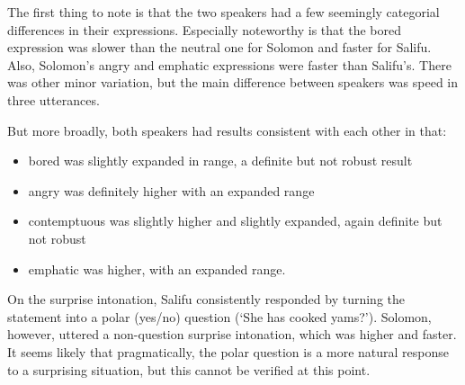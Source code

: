 \documentclass[output=paper]{langsci/langscibook}
\begin{document}
\begin{table}

\caption{`S/he has cooked yams' \emph{ù dìgìwó nyʊ́à} (Salifu)}
\label{tab:4.cahill}

\end{table}



The first thing to note is that the two speakers had a few seemingly categorial differences in their expressions. Especially noteworthy is that the bored expression was slower than the neutral one for Solomon and faster for Salifu. Also, Solomon's angry and emphatic expressions were faster than Salifu's. There was other minor variation, but the main difference between speakers was speed in three utterances.

But more broadly, both speakers had results consistent with each other in that:

\begin{itemize}
\item bored was slightly expanded in range, a definite but not robust result
\item angry was definitely higher with an expanded range
\item contemptuous was slightly higher and slightly expanded, again definite but not robust
\item emphatic was higher, with an expanded range. 
\end{itemize}

On the surprise intonation, Salifu consistently responded by turning the statement into a polar (yes/no) question (`She has cooked yams?'). Solomon, however, uttered a non-question surprise intonation, which was higher and faster. It seems likely that pragmatically, the polar question is a more natural response to a surprising situation, but this cannot be verified at this point. 
\end{document}
